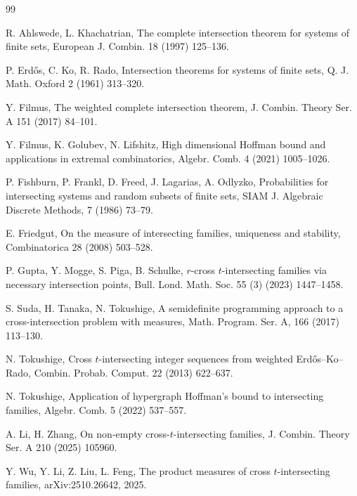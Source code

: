 \documentclass[11pt]{article}
\begin{document}
\begin{thebibliography}{99}

R. Ahlswede, L. Khachatrian, The complete intersection theorem for systems of finite sets, 
European J. Combin. 18 (1997) 125--136.

P. Erd{\H{o}}s, C. Ko, R. Rado, Intersection theorems for systems of finite sets, Q. J. Math. Oxford 2 (1961) 313--320.

Y. Filmus, The weighted complete intersection theorem, J. Combin. Theory Ser. A 151 (2017) 84--101.


Y. Filmus, K. Golubev,  N. Lifshitz, High dimensional Hoffman bound and applications in extremal combinatorics, Algebr. Comb. 4 (2021) 1005--1026.

 P. Fishburn, P. Frankl, D. Freed, J. Lagarias, A.  Odlyzko, Probabilities for intersecting systems and random subsets of finite sets, SIAM J. Algebraic Discrete Methods, 7 (1986) 73--79.

 E. Friedgut, On the measure of intersecting families, uniqueness and stability, Combinatorica 28 (2008) 503--528.

P. Gupta, Y. Mogge, S. Piga, B. Schulke,  
$r$-cross $t$-intersecting families via necessary intersection points, Bull. Lond. Math. Soc. 55 (3) (2023) 1447--1458.

 S. Suda, H. Tanaka,  N. Tokushige, A semidefinite programming approach to a cross-intersection problem with measures, Math. Program. Ser. A, 166 (2017) 113--130.

 N. Tokushige, Cross $t$-intersecting integer sequences from weighted Erd\H{o}s--Ko--Rado, Combin. Probab. Comput. 22 (2013) 622--637.

 N. Tokushige, Application of hypergraph Hoffman's bound to intersecting families, Algebr.  Comb.  5 (2022) 537--557.



A. Li, H. Zhang, On non-empty cross-$t$-intersecting families, J. Combin. Theory Ser. A 210 (2025) 105960.

Y. Wu, Y. Li, Z. Liu, L. Feng, The product measures of cross $t$-intersecting families, arXiv:2510.26642, 2025.








\end{thebibliography}
\end{document}
